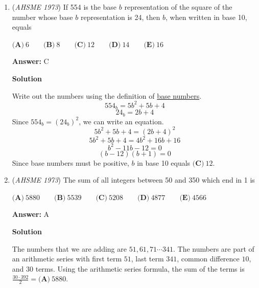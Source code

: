 \begin{enumerate}
 
\textbf{Statement IV}
 \[x + avg(y, z) = avg(x + y, x + z)\]
 \[x + \frac{y + z}{2} = \frac{2x + y + z}{2}\]
 \[\frac{2x + y + z}{2} = \frac{2x + y + z}{2}\]The left side and the right side are equivalent expressions, so Statement IV is true.

 
\textbf{Statement V}Let $i$ be the identity element. If such $i$ exists, then the following is true:
 \[avg(x, i) = x\]
 \[\frac{x + i}{2} = x\]
 \[x + i = 2x\]
 \[i = x\]However, since $x$ is a variable, but $i$ must be a constant, fixed number, there is no identity element for the binary operation of averaging. Therefore, Statement V is false.

 Statements II and IV are true, so the answer is $\boxed{\textbf{(D)} \text{II and IV only}}$.

 


	\item (\textit{AHSME 1973}) If 554 is the base $b$ representation of the square of the number whose base $b$ representation is 24, then $b$, when written in base 10, equals 


 $\textbf{(A)}\ 6\qquad\textbf{(B)}\ 8\qquad\textbf{(C)}\ 12\qquad\textbf{(D)}\ 14\qquad\textbf{(E)}\ 16$

 \textbf{Answer: }C



\textbf{Solution}

Write out the numbers using the definition of \href{https://artofproblemsolving.com/wiki/index.php?title=Base\_numbers}{base numbers}.
 \[554_b = 5b^2 + 5b + 4\]
 \[24_b = 2b+4\]Since $554_b = (24_b)^2$, we can write an equation.
 \[5b^2 + 5b + 4 = (2b+4)^2\]
 \[5b^2 + 5b + 4 = 4b^2 + 16b + 16\]
 \[b^2 - 11b - 12 = 0\]
 \[(b-12)(b+1) = 0\]Since base numbers must be positive, $b$ in base 10 equals $\boxed{\textbf{(C)}\ 12}$.

 


	\item (\textit{AHSME 1973}) The sum of all integers between 50 and 350 which end in 1 is 


  $\textbf{(A)}\ 5880\qquad\textbf{(B)}\ 5539\qquad\textbf{(C)}\ 5208\qquad\textbf{(D)}\ 4877\qquad\textbf{(E)}\ 4566$

 \textbf{Answer: }A



\textbf{Solution}

The numbers that we are adding are $51,61,71 \cdots 341$.  The numbers are part of an arithmetic series with first term $51$, last term $341$, common difference $10$, and $30$ terms.  Using the arithmetic series formula, the sum of the terms is $\frac{30 \cdot 392}{2} = \boxed{\textbf{(A)}\ 5880}$.


\end{enumerate}
